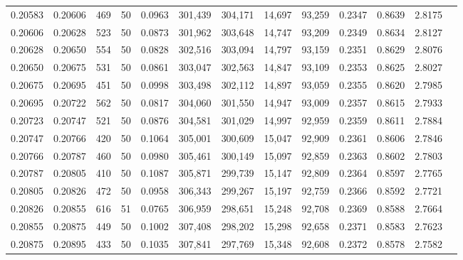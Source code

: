 \begin{tabular}{rrrrrrrrrrrrr}
0.20583 & 0.20606 &   469 &  50 &                                     0.0963 & 301,439 & 304,171 &  14,697 &  93,259 & 0.2347 & 0.8639 & 2.8175 \\
0.20606 & 0.20628 &   523 &  50 &                                     0.0873 & 301,962 & 303,648 &  14,747 &  93,209 & 0.2349 & 0.8634 & 2.8127 \\
0.20628 & 0.20650 &   554 &  50 &                                     0.0828 & 302,516 & 303,094 &  14,797 &  93,159 & 0.2351 & 0.8629 & 2.8076 \\
0.20650 & 0.20675 &   531 &  50 &                                     0.0861 & 303,047 & 302,563 &  14,847 &  93,109 & 0.2353 & 0.8625 & 2.8027 \\
0.20675 & 0.20695 &   451 &  50 &                                     0.0998 & 303,498 & 302,112 &  14,897 &  93,059 & 0.2355 & 0.8620 & 2.7985 \\
0.20695 & 0.20722 &   562 &  50 &                                     0.0817 & 304,060 & 301,550 &  14,947 &  93,009 & 0.2357 & 0.8615 & 2.7933 \\
0.20723 & 0.20747 &   521 &  50 &                                     0.0876 & 304,581 & 301,029 &  14,997 &  92,959 & 0.2359 & 0.8611 & 2.7884 \\
0.20747 & 0.20766 &   420 &  50 &                                     0.1064 & 305,001 & 300,609 &  15,047 &  92,909 & 0.2361 & 0.8606 & 2.7846 \\
0.20766 & 0.20787 &   460 &  50 &                                     0.0980 & 305,461 & 300,149 &  15,097 &  92,859 & 0.2363 & 0.8602 & 2.7803 \\
0.20787 & 0.20805 &   410 &  50 &                                     0.1087 & 305,871 & 299,739 &  15,147 &  92,809 & 0.2364 & 0.8597 & 2.7765 \\
0.20805 & 0.20826 &   472 &  50 &                                     0.0958 & 306,343 & 299,267 &  15,197 &  92,759 & 0.2366 & 0.8592 & 2.7721 \\
0.20826 & 0.20855 &   616 &  51 &                                     0.0765 & 306,959 & 298,651 &  15,248 &  92,708 & 0.2369 & 0.8588 & 2.7664 \\
0.20855 & 0.20875 &   449 &  50 &                                     0.1002 & 307,408 & 298,202 &  15,298 &  92,658 & 0.2371 & 0.8583 & 2.7623 \\
0.20875 & 0.20895 &   433 &  50 &                                     0.1035 & 307,841 & 297,769 &  15,348 &  92,608 & 0.2372 & 0.8578 & 2.7582 \\

\end{tabular}
